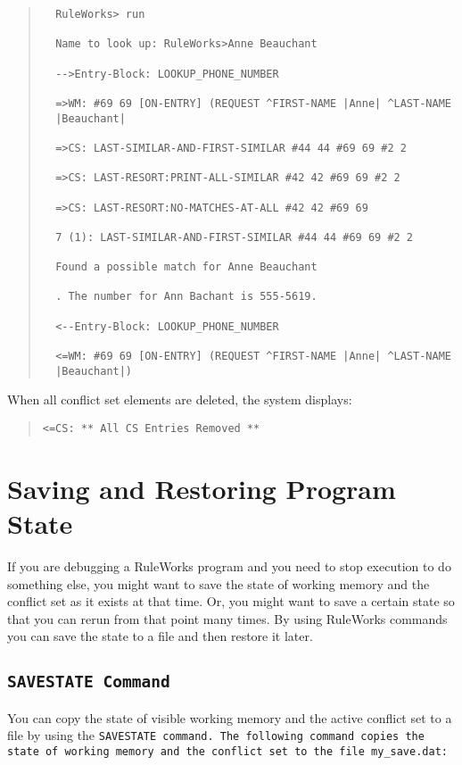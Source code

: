 \begin{note}
\begin{quote}
\begin{verbatim}
  RuleWorks> run

  Name to look up: RuleWorks>Anne Beauchant

  -->Entry-Block: LOOKUP_PHONE_NUMBER

  =>WM: #69 69 [ON-ENTRY] (REQUEST ^FIRST-NAME |Anne| ^LAST-NAME
  |Beauchant|

  =>CS: LAST-SIMILAR-AND-FIRST-SIMILAR #44 44 #69 69 #2 2

  =>CS: LAST-RESORT:PRINT-ALL-SIMILAR #42 42 #69 69 #2 2

  =>CS: LAST-RESORT:NO-MATCHES-AT-ALL #42 42 #69 69

  7 (1): LAST-SIMILAR-AND-FIRST-SIMILAR #44 44 #69 69 #2 2

  Found a possible match for Anne Beauchant

  . The number for Ann Bachant is 555-5619.

  <--Entry-Block: LOOKUP_PHONE_NUMBER

  <=WM: #69 69 [ON-ENTRY] (REQUEST ^FIRST-NAME |Anne| ^LAST-NAME
  |Beauchant|)
\end{verbatim}
\end{quote}
When all conflict set elements are deleted, the system displays:
\begin{quote}
\begin{verbatim}
<=CS: ** All CS Entries Removed **
\end{verbatim}
\end{quote}

\section{Saving and Restoring Program State}

If you are debugging a RuleWorks program and you need to stop
execution to do something else, you might want to save the state
of working memory and the conflict set as it exists at that
time. Or, you might want to save a certain state so that you can
rerun from that point many times. By using RuleWorks commands
you can save the state to a file and then restore it later.

\subsection{\tt{SAVESTATE} Command}

You can copy the state of visible working memory and the active
conflict set to a file by using the \tt{SAVESTATE} command. The
following command copies the state of working memory and the
conflict set to the file \verb|my_save.dat|:


\end{note}
